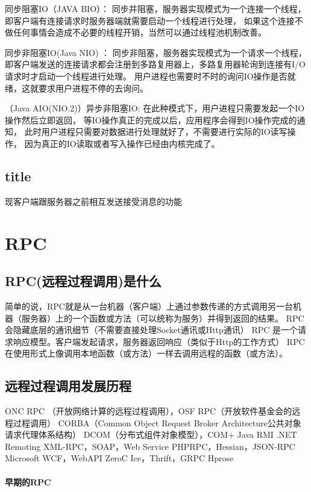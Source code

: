 \documentclass{book}
\begin{document}
同步阻塞IO（JAVA BIO）： 
同步并阻塞，服务器实现模式为一个连接一个线程，
即客户端有连接请求时服务器端就需要启动一个线程进行处理，
如果这个连接不做任何事情会造成不必要的线程开销，当然可以通过线程池机制改善。 

同步非阻塞IO(Java NIO) ： 同步非阻塞，服务器实现模式为一个请求一个线程，
即客户端发送的连接请求都会注册到多路复用器上，多路复用器轮询到连接有I/O请求时才启动一个线程进行处理。
用户进程也需要时不时的询问IO操作是否就绪，这就要求用户进程不停的去询问。

（Java AIO(NIO.2)）异步非阻塞IO:  
在此种模式下，用户进程只需要发起一个IO操作然后立即返回，
等IO操作真正的完成以后，应用程序会得到IO操作完成的通知，
此时用户进程只需要对数据进行处理就好了，不需要进行实际的IO读写操作，
因为真正的IO读取或者写入操作已经由内核完成了。 

\subsection{title}

现客户端跟服务器之前相互发送接受消息的功能

\section{RPC}

\subsection{RPC(远程过程调用)是什么}

简单的说，RPC就是从一台机器（客户端）上通过参数传递的方式调用另一台机器（服务器）上的一个函数或方法（可以统称为服务）并得到返回的结果。
RPC 会隐藏底层的通讯细节（不需要直接处理Socket通讯或Http通讯）
RPC 是一个请求响应模型。客户端发起请求，服务器返回响应（类似于Http的工作方式）
RPC 在使用形式上像调用本地函数（或方法）一样去调用远程的函数（或方法）。

\subsection{远程过程调用发展历程}

ONC RPC （开放网络计算的远程过程调用），OSF RPC（开放软件基金会的远程过程调用）
CORBA（Common Object Request Broker Architecture公共对象请求代理体系结构）
DCOM（分布式组件对象模型），COM+
Java RMI
.NET Remoting
XML-RPC，SOAP，Web Service
PHPRPC，Hessian，JSON-RPC
Microsoft WCF，WebAPI
ZeroC Ice，Thrift，GRPC
Hprose

\paragraph{早期的RPC}
\end{document}
